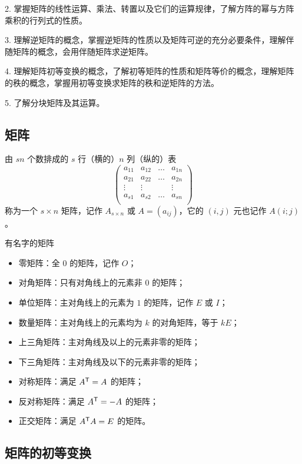 2. 掌握矩阵的线性运算、乘法、转置以及它们的运算规律，了解方阵的幂与方阵乘积的行列式的性质。

3. 理解逆矩阵的概念，掌握逆矩阵的性质以及矩阵可逆的充分必要条件，理解伴随矩阵的概念，会用伴随矩阵求逆矩阵。

4. 理解矩阵初等变换的概念，了解初等矩阵的性质和矩阵等价的概念，理解矩阵的秩的概念，掌握用初等变换求矩阵的秩和逆矩阵的方法。

5. 了解分块矩阵及其运算。

\subsection{矩阵}

由 $sn$ 个数排成的 $s$ 行（横的）$n$ 列（纵的）表
\[ \left(
	\begin{matrix}
			a_{11} & a_{12} & \ldots & a_{1n} \\
			a_{21} & a_{22} & \ldots & a_{2n} \\
			\vdots & \vdots &        & \vdots \\a_{s1}&a_{s2}&\ldots&a_{sn}\\
		\end{matrix}
	\right) \]
称为一个 $s\times n$ 矩阵，记作 $A_{s\times n}$ 或 $A=(a_{ij})$，它的 $(i,j)$ 元也记作 $A(i;j)$。

有名字的矩阵
\begin{itemize}
	\item 零矩阵：全 $0$ 的矩阵，记作 $O$；
	\item 对角矩阵：只有对角线上的元素非 $0$ 的矩阵；
	\item 单位矩阵：主对角线上的元素为 $1$ 的矩阵，记作 $E$ 或 $I$；
	\item 数量矩阵：主对角线上的元素均为 $k$ 的对角矩阵，等于 $kE$；
	\item 上三角矩阵：主对角线及以上的元素非零的矩阵；
	\item 下三角矩阵：主对角线及以下的元素非零的矩阵；
	\item 对称矩阵：满足 ${A}^\mathsf{T} = A$ 的矩阵；
	\item 反对称矩阵：满足 ${A}^\mathsf{T} = -A$ 的矩阵；
	\item 正交矩阵：满足 ${A}^\mathsf{T}A=E$ 的矩阵。
\end{itemize}

\subsection{矩阵的初等变换}

